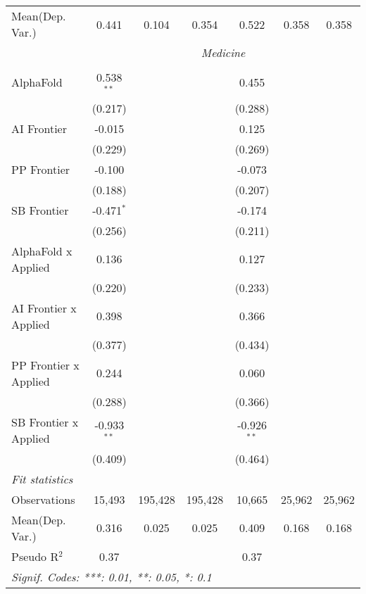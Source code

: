\begin{tabular}{lcccccc}
Mean(Dep. Var.) & 0.441 & 0.104 & 0.354 & 0.522 & 0.358 & 0.358 \\
 & \multicolumn{6}{c}{\textit{Medicine}} \\ \\
   AlphaFold             & 0.538$^{**}$  &         &         & 0.455         &        &   \\   
                         & (0.217)       &         &         & (0.288)       &        &   \\   
   AI Frontier           & -0.015        &         &         & 0.125         &        &   \\   
                         & (0.229)       &         &         & (0.269)       &        &   \\   
   PP Frontier           & -0.100        &         &         & -0.073        &        &   \\   
                         & (0.188)       &         &         & (0.207)       &        &   \\   
   SB Frontier           & -0.471$^{*}$  &         &         & -0.174        &        &   \\   
                         & (0.256)       &         &         & (0.211)       &        &   \\   
   AlphaFold x Applied   & 0.136         &         &         & 0.127         &        &   \\   
                         & (0.220)       &         &         & (0.233)       &        &   \\   
   AI Frontier x Applied & 0.398         &         &         & 0.366         &        &   \\   
                         & (0.377)       &         &         & (0.434)       &        &   \\   
   PP Frontier x Applied & 0.244         &         &         & 0.060         &        &   \\   
                         & (0.288)       &         &         & (0.366)       &        &   \\   
   SB Frontier x Applied & -0.933$^{**}$ &         &         & -0.926$^{**}$ &        &   \\   
                         & (0.409)       &         &         & (0.464)       &        &   \\   
   \midrule
   \emph{Fit statistics}\\
   Observations          & 15,493        & 195,428 & 195,428 & 10,665        & 25,962 & 25,962\\  
Mean(Dep. Var.) & 0.316 & 0.025 & 0.025 & 0.409 & 0.168 & 0.168 \\
   Pseudo R$^2$          & 0.37          &         &         & 0.37          &        & \\  
   \midrule \midrule
   \multicolumn{7}{l}{\emph{Signif. Codes: ***: 0.01, **: 0.05, *: 0.1}}\\
\end{tabular}
\par\endgroup
